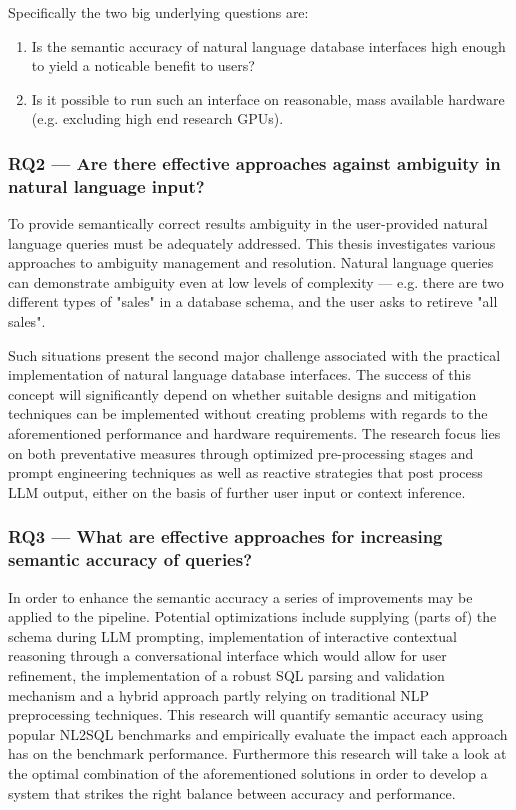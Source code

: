\documentclass{article}
\begin{document}
Specifically the two big underlying questions are:

\begin{enumerate}
    \item Is the semantic accuracy of natural language database interfaces high enough to yield a noticable
          benefit to users?
    \item Is it possible to run such an interface on reasonable, mass available hardware (e.g. excluding high end research GPUs).
\end{enumerate}

\subsubsection*{RQ2 — Are there effective approaches against ambiguity in natural language input?}

To provide semantically correct results ambiguity in the user-provided natural language queries must be 
adequately addressed. This thesis investigates various approaches to ambiguity management and
resolution. Natural language queries can demonstrate ambiguity even at low levels of complexity —
e.g. there are two different types of "sales" in a database schema, and the user asks to retireve
"all sales".

Such situations present the second major challenge associated with the practical implementation of natural
language database interfaces. The success of this concept will significantly depend on whether suitable 
designs and mitigation techniques can be implemented without creating problems with regards to the 
aforementioned performance and hardware requirements. The research focus lies on both preventative measures
through optimized pre-processing stages and prompt engineering techniques as well as reactive strategies
that post process LLM output, either on the basis of further user input or context inference.

\subsubsection*{RQ3 — What are effective approaches for increasing semantic accuracy of queries?}

In order to enhance the semantic accuracy a series of improvements may be applied to the pipeline.
Potential optimizations include supplying (parts of) the schema during LLM prompting, implementation of
interactive contextual reasoning through a conversational interface which would allow for user
refinement, the implementation of a robust SQL parsing and validation mechanism and a hybrid approach
partly relying on traditional NLP preprocessing techniques. This research will quantify semantic accuracy
using popular NL2SQL benchmarks and empirically evaluate the impact each approach has on the benchmark
performance. Furthermore this research will take a look at the optimal combination of the aforementioned
solutions in order to develop a system that strikes the right balance between accuracy and performance.
\end{document}
